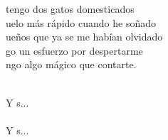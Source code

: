 \begin{cancion}
	 tengo dos gatos domesticados\\
	uelo más rápido cuando he soñado\\
	ueños que ya se me habían olvidado\\
	go un esfuerzo por despertarme\\
	ngo algo mágico que contarte.\\\jump\\
	\begin{chorus}%
	Y s... \\
	       \\
	Y s... \\
	\end{chorus}%
	\jump\\
\end{cancion}%

